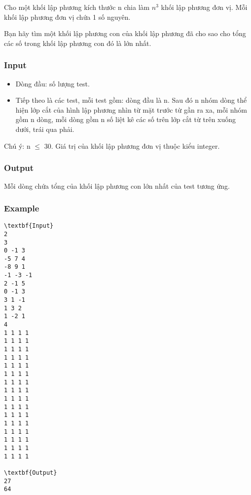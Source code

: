 

Cho một khối lập phương kích thước n chia làm $n^{3}$ khối lập phương đơn vị. Mỗi khối lập phương đơn vị chứa 1 số nguyên.


Bạn hãy tìm một khối lập phương con của khối lập phương đã cho sao cho tổng các số trong khối lập phương con đó là lớn nhất.

\subsubsection{Input}
\begin{itemize}
	\item Dòng đầu: số lượng test.
	\item Tiếp theo là các test, mỗi test gồm: dòng đầu là n. Sau đó n nhóm dòng thể hiện lớp cắt của hình lập phương nhìn từ mặt trước từ gần ra xa, mỗi nhóm gồm n dòng, mỗi dòng gồm n số liệt kê các số trên lớp cắt từ trên xuống dưới, trái qua phải.
\end{itemize}

Chú ý: n  $\le$  30. Giá trị của khối lập phương đơn vị thuộc kiểu integer.

\subsubsection{Output}

Mỗi dòng chứa tổng của khối lập phương con lớn nhất của test tương ứng.

\subsubsection{Example}
\begin{verbatim}
\textbf{Input}
2
3
0 -1 3
-5 7 4
-8 9 1
-1 -3 -1
2 -1 5
0 -1 3
3 1 -1
1 3 2
1 -2 1
4
1 1 1 1
1 1 1 1
1 1 1 1
1 1 1 1
1 1 1 1
1 1 1 1
1 1 1 1
1 1 1 1
1 1 1 1
1 1 1 1
1 1 1 1
1 1 1 1
1 1 1 1
1 1 1 1
1 1 1 1
1 1 1 1

\textbf{Output}
27
64
\end{verbatim}
